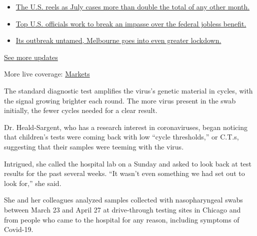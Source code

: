 \begin{itemize}
\tightlist
\item
  \href{https://www.nytimes.com/2020/08/01/world/coronavirus-covid-19.html?action=click\&pgtype=Article\&state=default\&region=MAIN_CONTENT_1\&context=storylines_live_updates\#link-34047410}{The
  U.S. reels as July cases more than double the total of any other
  month.}
\item
  \href{https://www.nytimes.com/2020/08/01/world/coronavirus-covid-19.html?action=click\&pgtype=Article\&state=default\&region=MAIN_CONTENT_1\&context=storylines_live_updates\#link-780ec966}{Top
  U.S. officials work to break an impasse over the federal jobless
  benefit.}
\item
  \href{https://www.nytimes.com/2020/08/01/world/coronavirus-covid-19.html?action=click\&pgtype=Article\&state=default\&region=MAIN_CONTENT_1\&context=storylines_live_updates\#link-2bc8948}{Its
  outbreak untamed, Melbourne goes into even greater lockdown.}
\end{itemize}

\href{https://www.nytimes.com/2020/08/01/world/coronavirus-covid-19.html?action=click\&pgtype=Article\&state=default\&region=MAIN_CONTENT_1\&context=storylines_live_updates}{See
more updates}

More live coverage:
\href{https://www.nytimes.com/live/2020/07/31/business/stock-market-today-coronavirus?action=click\&pgtype=Article\&state=default\&region=MAIN_CONTENT_1\&context=storylines_live_updates}{Markets}

The standard diagnostic test amplifies the virus's genetic material in
cycles, with the signal growing brighter each round. The more virus
present in the swab initially, the fewer cycles needed for a clear
result.

Dr. Heald-Sargent, who has a research interest in coronaviruses, began
noticing that children's tests were coming back with low ``cycle
thresholds,'' or C.T.s, suggesting that their samples were teeming with
the virus.

Intrigued, she called the hospital lab on a Sunday and asked to look
back at test results for the past several weeks. ``It wasn't even
something we had set out to look for,'' she said.

She and her colleagues analyzed samples collected with nasopharyngeal
swabs between March 23 and April 27 at drive-through testing sites in
Chicago and from people who came to the hospital for any reason,
including symptoms of Covid-19.


